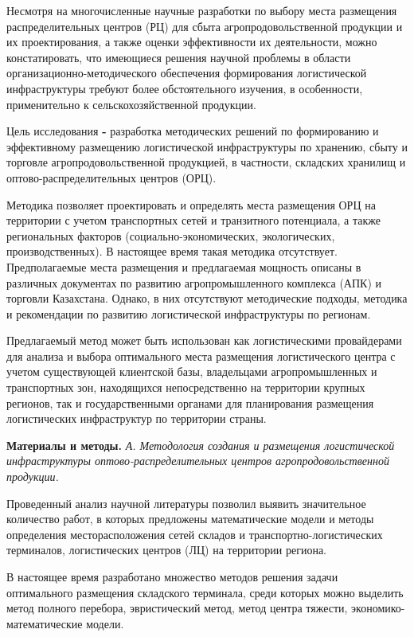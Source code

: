 Несмотря на многочисленные научные разработки по выбору места размещения
распределительных центров (РЦ) для сбыта агропродовольственной продукции
и их проектирования, а также оценки эффективности их деятельности, можно
констатировать, что имеющиеся решения научной проблемы в области
организационно-методического обеспечения формирования логистической
инфраструктуры требуют более обстоятельного изучения, в особенности,
применительно к сельскохозяйственной продукции.

Цель исследования {\bfseries -} разработка методических решений по
формированию и эффективному размещению логистической инфраструктуры по
хранению, сбыту и торговле агропродовольственной продукцией, в
частности, складских хранилищ и оптово-распределительных центров (ОРЦ).

Методика позволяет проектировать и определять места размещения ОРЦ на
территории с учетом транспортных сетей и транзитного потенциала, а также
региональных факторов (социально-экономических, экологических,
производственных). В настоящее время такая методика отсутствует.
Предполагаемые места размещения и предлагаемая мощность описаны в
различных документах по развитию агропромышленного комплекса (АПК) и
торговли Казахстана. Однако, в них отсутствуют методические подходы,
методика и рекомендации по развитию логистической инфраструктуры по
регионам.

Предлагаемый метод может быть использован как логистическими
провайдерами для анализа и выбора оптимального места размещения
логистического центра с учетом существующей клиентской базы, владельцами
агропромышленных и транспортных зон, находящихся непосредственно на
территории крупных регионов, так и государственными органами для
планирования размещения логистических инфраструктур по территории
страны.

{\bfseries Материалы и методы.} \emph{А. Методология создания и размещения
логистической инфраструктуры оптово-распределительных центров
агропродовольственной продукции.}

Проведенный анализ научной литературы позволил выявить значительное
количество работ, в которых предложены математические модели и методы
определения месторасположения сетей складов и транспортно-логистических
терминалов, логистических центров (ЛЦ) на территории региона.

В настоящее время разработано множество методов решения задачи
оптимального размещения складского терминала, среди которых можно
выделить метод полного перебора, эвристический метод, метод центра
тяжести, экономико-математические модели.

